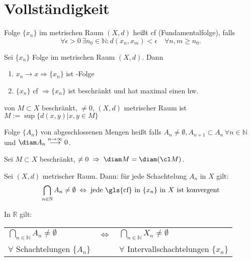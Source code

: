 \section{Vollständigkeit}
\begin{definition}
	Folge $\{x_n\}$ im metrischen Raum $(X,d)$ heißt \gls{cf} (Fundamentalfolge), falls
    \[
    \forall\epsilon > 0 \,\exists n_0\in\mathbb{N}: d(x_n, x_m) < \epsilon\quad\forall n,m\ge n_0.
    \]
\end{definition}
\begin{proposition}
	Sei $\{x_n\}$ Folge im metrischen Raum $(X,d)$. Dann
	\begin{enumerate}[label={\arabic*)}]
		\item $x_n\rightarrow x \Rightarrow \{x_n\}$ ist -Folge
		\item $\{x_n\}$ \gls{cf} $\Rightarrow \{x_n\}$ ist beschränkt und hat maximal einen \gls{hw}.
	\end{enumerate}
\end{proposition}
\begin{definition}[Durchmesser]
	 von $M\subset X$ beschränkt, $\neq 0$, $(X,d)$ metrischer Raum ist $M:=\sup\{d(x,y) | x,y\in M\}$
	
	Folge $\{A_n\}$ von abgeschlossenen Mengen heißt  falls $A_n\neq\emptyset, A_{n+1}\subset A_n\,\forall n\in\mathbb{N}$ und $\diam A_n\overset{n\rightarrow\infty}{\longrightarrow}0$.
\end{definition}
\begin{lemma}
	Sei $M\subset X$ beschränkt, $\neq 0\;\Rightarrow\;\diam M = \diam (\cl M)$.
\end{lemma}
\begin{theorem}
	Sei $(X,d)$ metrischer Raum. Dann: für jede Schachtelung $A_n$ in $X$ gilt:\[ \bigcap_{n\in\mathbb{N}} A_n\neq \emptyset \;\Leftrightarrow \; \text{jede \gls{cf} in $\{x_n\}$ in $X$ ist konvergent} \]
\end{theorem}
\begin{lemma}
	In $\mathbb{R}$ gilt:
	\begin{center}
		\begin{tabular}{lcl}
			$\bigcap_{n\in\mathbb{N}} A_n\neq \emptyset$ & $\Leftrightarrow$ & $\bigcap_{n\in\mathbb{N}} X_n\neq \emptyset$ \\[5pt]
			$\forall$ Schachtelungen $\{A_n\}$ && $\forall$ Intervallschachtelungen $\{x_n\}$
		\end{tabular}
	\end{center}
\end{lemma}
